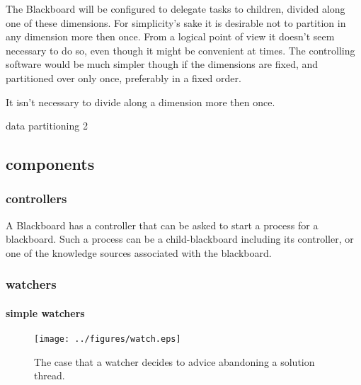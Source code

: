\documentclass[]{lofar}
\begin{document}
      The Blackboard will be configured to delegate tasks to children,
      divided along one of these dimensions. For simplicity's sake it
      is desirable not to partition in any dimension more then
      once. From a logical point of view it doesn't seem necessary to
      do so, even though it might be convenient at times. The
      controlling software would be much simpler though if the
      dimensions are fixed, and partitioned over only once,
      preferably in a fixed order.

      \begin{assumption}
        It isn't necessary to divide along a dimension more then once.
        \caption{data partitioning 2\label{ass:devision}}
      \end{assumption}

    \subsection{components}
    \label{subsec:components}\hypertarget{subsec:components}{}

      \subsubsection{controllers}
      \label{subsubsec:controllers}\hypertarget{subsubsec:controllers}{}

        A Blackboard has a controller that can be asked to start a
        process for a blackboard. Such a process can be a
        child-blackboard including its controller, or one of the
        knowledge sources associated with the blackboard.

      \subsubsection{watchers}
      \label{subsubsec:watchers}\hypertarget{subsubsec:watchers}{}

        \paragraph{simple watchers}
        \label{par:simple-watchers}\hypertarget{par:simple-watchers}{}
          \begin{figure}
            \texttt{[image: ../figures/watch.eps]}
            \hypertarget{fig:watchers}{}
            \caption{The case that a watcher decides to advice
            abandoning a solution thread.\label{fig:watchers}}
          \end{figure}
\end{document}
